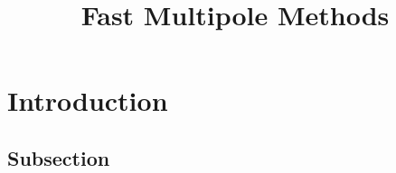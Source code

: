 \documentclass[english]{finalproject}
\title{Fast Multipole Methods}
\begin{document}
\maketitle

\section{Introduction} \label{introduction}

\subsection{Subsection}



\clearpage


\end{document}

